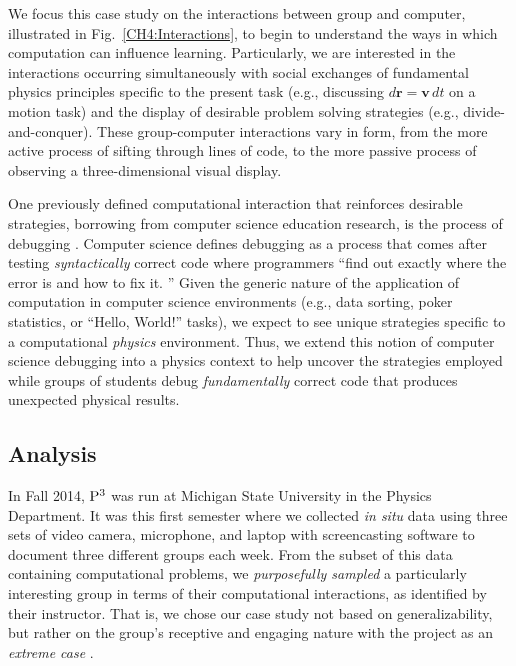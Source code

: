 \documentclass{msuphddissertation}
\begin{document}
\begin{doublespace}
We focus this case study on the interactions between group and computer, illustrated in Fig.~\ref{CH4:Interactions}, to begin to understand the ways in which computation can influence learning.  Particularly, we are interested in the interactions occurring simultaneously with social exchanges of fundamental physics principles specific to the present task (e.g., discussing $d\mathbf{r}=\mathbf{v}\,dt$ on a motion task) and the display of desirable problem solving strategies (e.g., divide-and-conquer).  These group-computer interactions vary in form, from the more active process of sifting through lines of code, to the more passive process of observing a three-dimensional visual display.

One previously defined computational interaction that reinforces desirable strategies, borrowing from computer science education research, is the process of debugging \cite{Fitzgerald2008}.  Computer science defines debugging as a process that comes after testing \emph{syntactically} correct code where programmers ``find out exactly where the error is and how to fix it. \cite{McCauley2008}''  Given the generic nature of the application of computation in computer science environments (e.g., data sorting, poker statistics, or ``Hello, World!'' tasks), we expect to see unique strategies specific to a computational \emph{physics} environment.  Thus, we extend this notion of computer science debugging into a physics context to help uncover the strategies employed while groups of students debug \emph{fundamentally} correct code that produces unexpected physical results.

\subsection{Analysis}

In Fall 2014, ${\rm P}^{3}$ was run at Michigan State University in the Physics Department.  It was this first semester where we collected \emph{in situ} data using three sets of video camera, microphone, and laptop with screencasting software to document three different groups each week.  From the subset of this data containing computational problems, we \emph{purposefully sampled} a particularly interesting group in terms of their computational interactions, as identified by their instructor.  That is, we chose our case study not based on generalizability, but rather on the group's receptive and engaging nature with the project as an \emph{extreme case} \cite{Flyvbjerg2006}.


\end{doublespace}
\end{document}
